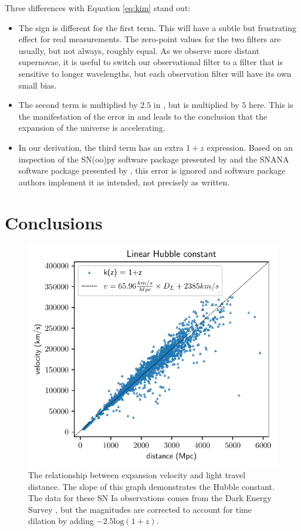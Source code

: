 \documentclass[aps,prl,reprint,amsmath,floatfix]{revtex4-2}
\begin{document}
Three differences with Equation \ref{eq:kim} stand out:

\begin{itemize}
  \item The sign is different for the first term. This will have a subtle but
  frustrating effect for real measurements. The zero-point values for the two
  filters are usually, but not always, roughly equal. As we observe more
  distant supernovae, it is useful to switch our observational filter to a
  filter that is sensitive to longer wavelengths, but each observation filter will
  have its own small bias.

  \item The second term is multiplied by $2.5$ in \citet{kim1996}, but is
  multiplied by $5$ here. This is the manifestation of the error in
  \citet{tolman1930} and leads to the conclusion that the expansion of the
  universe is accelerating.

  \item In our derivation, the third term has an extra $1 + z$ expression.
  Based on an inspection of the SN(oo)py software package presented by
  \citet{burns2010} and the SNANA software package presented by
  \citet{kessler2009}, this error is ignored and software package authors
  implement it as intended, not precisely as written.
\end{itemize}

\section{Conclusions}

\begin{figure}
  \includegraphics[width=\columnwidth]{velocity_vs_distance.pdf}
  \caption{The relationship between expansion velocity and light travel
  distance. The slope of this graph demonstrates the Hubble constant. The data
  for these SN Ia observations comes from the Dark Energy Survey
  \citep{vincenzi2024}, but the magnitudes are corrected to account for time
  dilation by adding ${-2.5 \text{log}(1 + z)}$.
  }
\label{fig:expansion}
\end{figure}
\end{document}
